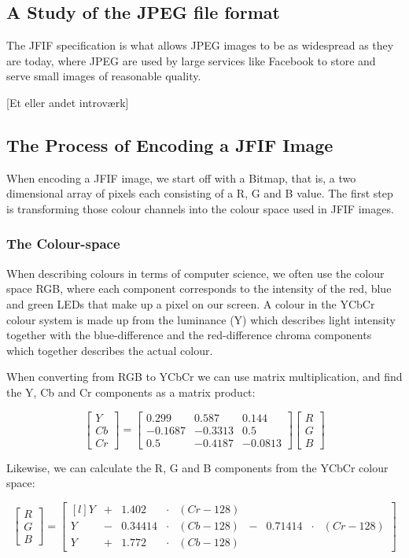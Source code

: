 \begin{infobox}{\section[A Study of the JPEG file format]{A Study of the JPEG file format}}
The JFIF specification is what allows JPEG images to be as widespread as they are today, where JPEG are used by large services like Facebook to store and serve small images of reasonable quality.

[Et eller andet introværk]

\subsection*{The Process of Encoding a JFIF Image}
When encoding a JFIF image, we start off with a Bitmap, that is, a two dimensional array of pixels each consisting of a R, G and B value. The first step is transforming those colour channels into the colour space used in JFIF images. 

\subsubsection*{The Colour-space}
When describing colours in terms of computer science, we often use the colour space RGB, where each component corresponds to the intensity of the red, blue and green LEDs that make up a pixel on our screen. A colour in the YCbCr colour system is made up from the luminance (Y) which describes light intensity together with the blue-difference and the red-difference chroma components which together describes the actual colour.

When converting from RGB to YCbCr we can use matrix multiplication, and find the Y, Cb and Cr components as a matrix product:

$$\begin{bmatrix}
	Y\\Cb\\Cr
\end{bmatrix} = \begin{bmatrix}
	0.299 & 0.587 & 0.144\\
	-0.1687 & -0.3313 & 0.5\\
	0.5 & -0.4187 & -0.0813
\end{bmatrix}\begin{bmatrix}
	R\\G\\B
\end{bmatrix}$$

Likewise, we can calculate the R, G and B components from the YCbCr colour space:

$$\begin{bmatrix}
	R\\G\\B
\end{bmatrix} = \begin{bmatrix*}[l]
	Y&+&1.402 &\cdot & (Cr-128)&\\
	Y &-& 0.34414&\cdot &(Cb-128) &- &0.71414&\cdot&(Cr-128)\\
	Y &+& 1.772&\cdot& (Cb-128)&
\end{bmatrix*}$$


\end{infobox}

